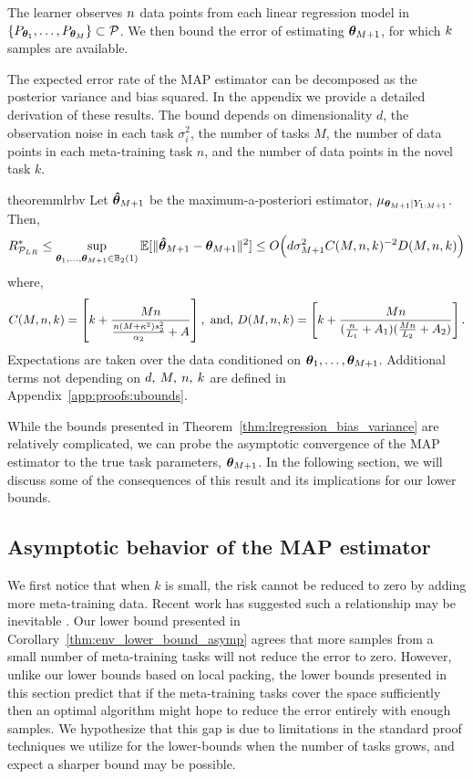 The learner observes ${n}$ data points from each linear regression model in $\{ P_{\bm{\theta}_1}, \ldots, P_{\bm{\theta}_M} \} \subset \mathcal{P}$. We then bound the error of estimating $\bm{\theta}_{M+1}$, for which ${k}$ samples are available.

The expected error rate of the MAP estimator can be decomposed as the posterior variance and bias squared. In the appendix we provide a detailed derivation of these results. The bound depends on dimensionality $d$, the observation noise in each task $\sigma^2_i$, the number of tasks $M$, the number of data points in each meta-training task $n$, and the number of data points in the novel task $k$.

\begin{restatable}{theorem}{mlrbv}\label{thm:lregression_bias_variance}
Let $\bm{\hat{\theta}}_{M+1}$ be the maximum-a-posteriori estimator, $\mu_{\bm{\theta}_{M+1} \vert Y_{1:M+1}}$. Then,
\[ R^*_{\mathcal{P}_{LR}} \leq \sup_{\bm{\theta}_1,\ldots,\bm{\theta}_{M+1} \in \mathbb{B}_2(1)}\mathbb{E}[\Vert\bm{\hat{\theta}}_{M+1} - \bm{\theta}_{M+1}\Vert^2] \leq O\Bigl(d \sigma^2_{M+1} C(M, {n}, {k})^{-2} D(M, {n}, {k})\Bigr) \]
where,
\[C(M, {n}, {k}) = \left[ {k} + 
\frac{M{n}}{\frac{{n} (M +\kappa^2)s_2^2}{\alpha_2} + A} \right], \textrm{ and,  }D(M, {n}, {k}) = \left[ {k} + \frac{M{n}}{ 
(\frac{{n}}{L_1} + A_1 ) 
(\frac{M{n}}{L_2} + A_2)}\right].\]
Expectations are taken over the data conditioned on $\bm{\theta}_1,\ldots,\bm{\theta}_{M+1}$. Additional terms not depending on $d,\:M,\:{n},\:{k}$ are defined in Appendix~\ref{app:proofs:ubounds}.
\end{restatable}

While the bounds presented in Theorem~\ref{thm:lregression_bias_variance} are relatively complicated, we can probe the asymptotic convergence of the MAP estimator to the true task parameters, $\bm{\theta}_{M+1}$. In the following section, we will discuss some of the consequences of this result and its implications for our lower bounds.

\subsection{Asymptotic behavior of the MAP estimator} 

We first notice that when $k$ is small, the risk cannot be reduced to zero by adding more meta-training data. Recent work has suggested such a relationship may be inevitable \citep{hanneke2020no}. Our lower bound presented in Corollary~\ref{thm:env_lower_bound_asymp} agrees that more samples from a small number of meta-training tasks will not reduce the error to zero. However, 
unlike our lower bounds
based on local packing, the lower bounds presented in this section predict that if the meta-training tasks cover the space sufficiently then an optimal algorithm might hope to reduce the error entirely with enough samples. We hypothesize that this gap is due to limitations in the standard proof techniques we utilize for the lower-bounds when the number of tasks grows, and expect a sharper bound may be possible.

